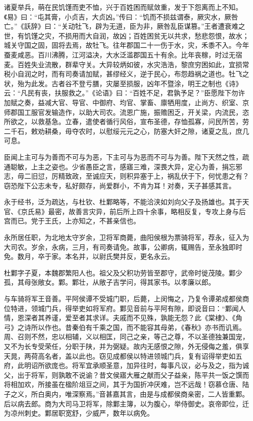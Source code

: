 \documentclass[12pt,UTF8]{ctexbook}
\begin{document}
诸夏举兵，萌在民饥馑而吏不恤，兴于百姓困而赋敛重，发于下怨离而上不知。《易》曰：“屯其膏，小贞吉，大贞凶。”传曰：“饥而不损兹谓泰，厥灾水，厥咎亡。”《訞辞》曰：“关动牡飞，辟为无道，臣为非，厥咎乱臣谋篡。”王者遭衰难之世，有饥馑之灾，不损用而大自润，故凶；百姓困贫无以共求，愁悲怨恨，故水；城关守国之固，固将去焉，故牡飞。往年郡国二十一伤于水，灾，禾黍不入。今年蚕麦咸恶。百川沸腾，江河溢决，大水泛滥郡国五十有余。比年丧稼，时过无宿麦。百姓失业流散，群辈守关。大异较炳如彼，水灾浩浩，黎庶穷困如此，宜损常税小自润之时，而有司奏请加赋，甚缪经义，逆于民心，布怨趋祸之道也。牡飞之状，殆为此发。古者谷不登亏膳，灾屡至损服，凶年不暨涂，明王之制也《诗》云：“凡民有丧，扶服救之。”《论语》曰：“百姓不足，君孰予足？”臣愿陛下勿许加赋之奏，益减大官、导官、中御府、均官、掌畜、廪牺用度，止尚方、织室、京师郡国工服官发输造作，以助大司农。流恩广施，振赡困乏，开关梁，内流民，恣所欲之，以救基急。立春，遣使者循行风俗，宣布圣德，存恤孤寡，问民所苦，劳二千石，敕劝耕桑，毋夺农时，以慰绥元元之心，防塞大奸之隙，诸夏之乱，庶几可息。



臣闻上主可与为善而不可与为恶，下主可与为恶而不可与为善。陛下天然之性，疏通聪敏，上主之姿也。少省愚臣之言，感寤三难，深畏大异，定心为善，捐忘邪志，毋二旧愆，厉精致政，至诚应天，则积异塞于上，祸乱伏于下，何忧患之有？窃恐陛下公志未专，私好颇存，尚爱群小，不肯为耳！对奏，天子甚感其言。



永于经书，泛为疏达，与杜钦、杜鄴略等，不能洽浃如刘向父子及扬雄也。其于天官、《京氏易》最密，故善言灾异，前后所上四十余事，略相反复，专攻上身与后宫而已。党于王氏，上亦知之，不甚亲信也。



永所居任职，为北地太守岁余，卫将军商薨，曲阳侯根为票骑将军，荐永，征入为大司农。岁余，永病，三月，有司奏请免。故事，公卿病，辄赐告，至永独即时免。数月，卒于家。本名并，以尉氏樊并反，更名永云。



杜鄴字子夏，本魏郡繁阳人也。祖父及父积功劳皆至郡守，武帝时徙茂陵。鄴少孤，其母张敞女。鄴。鄴壮，从敞子吉学问，得其家书。以孝廉以郎。



与车骑将军王音善。平阿侯谭不受城门职，后薨，上闵悔之，乃复令谭弟成都侯商位特进，领城门兵，得举吏如将军府。鄴见音前与平阿有隙，即说音曰：“鄴闻人情，恩深者其养谨，爱至者其求详。夫戚而不见殊，孰能无怨？此《棠棣》、《角弓》之诗所以作也。昔秦伯有千乘之国，而不能容其母弟，《春秋》亦书而讥焉。周、召则不然，忠以相辅，义以相匡，同己之亲，等己之尊，不以圣德独兼国宠，又不为长专受荣任，分职于陕，并为弼疑。故内无感恨之隙，外无侵侮之羞，俱享天晁，两荷高名者，盖以此也。窃见成都侯以特进领城门兵，复有诏得举吏如五府，此明诏所欲庞也。将军宜承顺圣意，加异往时，每事凡议，必与及之，指为诚父，出于将军，则孰敢不说谕？昔文侯寤大雁之献而父子益亲，陈平共一饭之馔而将相加欢，所接虽在楹阶俎豆之间，其于为国折冲厌难，岂不远哉！窃慕仓唐、陆子之义，所白奥内，唯深察焉。”音甚嘉其言，由是与成都侯商亲密，二人皆重鄴。后以病去郎。商为大司马卫将军，除鄴主簿，以为腹心，举侍御史。哀帝即位，迁为凉州刺史。鄴居职宽舒，少威严，数年以病免。
\end{document}
